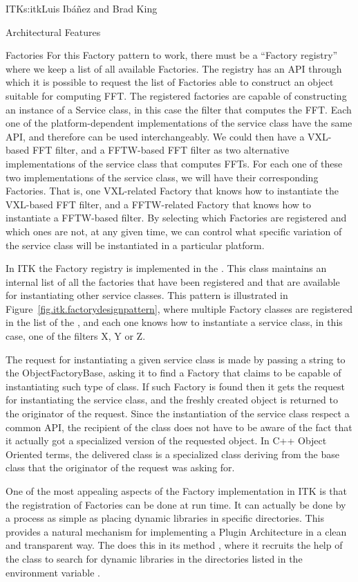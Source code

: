 \begin{aosachapter}{ITK}{s:itk}{Luis Ib\'{a}\~{n}ez and Brad King}
\begin{aosasect1}{Architectural Features}
\begin{aosasect2}{Factories}
For this Factory pattern to work, there must be a ``Factory registry'' where we
keep a list of all available Factories. The registry has an API through which
it is possible to request the list of Factories able to construct an object
suitable for computing FFT. The registered factories are capable of
constructing an instance of a Service class, in this case the filter that
computes the FFT. Each one of the platform-dependent implementations of the
service class have the same API, and therefore can be used interchangeably.  We
could then have a VXL-based FFT filter, and a FFTW-based FFT filter as two
alternative implementations of the service class that computes FFTs. For each
one of these two implementations of the service class, we will have their
corresponding Factories. That is, one VXL-related Factory that knows how to
instantiate the VXL-based FFT filter, and a FFTW-related Factory that knows how
to instantiate a FFTW-based filter. By selecting which Factories are registered and which ones are not, at any
given time, we can control what specific variation of the service class will be
instantiated in a particular platform.

In ITK the Factory registry is implemented in the .
This class maintains an internal list of all the factories that have been
registered and that are available for instantiating other service classes. This
pattern is illustrated in Figure~\ref{fig.itk.factorydesignpattern}, where
multiple Factory classes are registered in the list of the
, and each one knows how to instantiate a service
class, in this case, one of the filters X, Y or Z.

The request for instantiating a given service class is made by passing a string
to the ObjectFactoryBase, asking it to find a Factory that claims to be capable
of instantiating such type of class. If such Factory is found then it gets the
request for instantiating the service class, and the freshly created object is
returned to the originator of the request. Since the instantiation of the
service class respect a common API, the recipient of the class does not have to
be aware of the fact that it actually got a specialized version of the
requested object. In C++ Object Oriented terms, the delivered class is a
specialized class deriving from the base class that the originator of the
request was asking for.

One of the most appealing aspects of the Factory implementation in ITK is that
the registration of Factories can be done at run time. It can actually be done
by a process as simple as placing dynamic libraries in specific directories.
This provides a natural mechanism for implementing a Plugin Architecture in a
clean and transparent way. The  does this in its method
, where it recruits the help of the
 class to search for dynamic libraries in the directories
listed in the environment variable .


\end{aosasect2}
\end{aosasect1}
\end{aosachapter}
